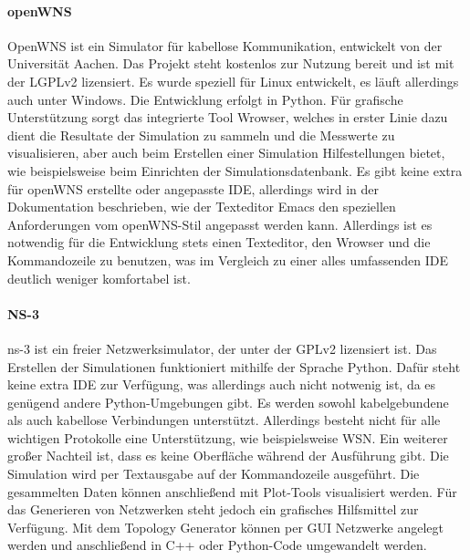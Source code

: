 \paragraph{openWNS\cite{openwns}}

OpenWNS ist ein Simulator für kabellose Kommunikation, entwickelt von der Universität Aachen. Das Projekt steht kostenlos zur Nutzung bereit und ist mit der LGPLv2 lizensiert. \newline
Es wurde speziell für Linux entwickelt, es läuft allerdings auch unter Windows. Die Entwicklung erfolgt in Python. Für grafische Unterstützung sorgt das integrierte Tool Wrowser\cite{wrowser}, welches in erster Linie dazu dient die Resultate der Simulation zu sammeln und die Messwerte zu visualisieren, aber auch beim Erstellen einer Simulation Hilfestellungen bietet, wie beispielsweise beim Einrichten der Simulationsdatenbank.\newline
Es gibt keine extra für openWNS erstellte oder angepasste IDE, allerdings wird in der Dokumentation beschrieben, wie der Texteditor Emacs\cite{emacs} den speziellen Anforderungen vom openWNS-Stil angepasst werden kann. Allerdings ist es notwendig für die Entwicklung stets einen Texteditor, den Wrowser und die Kommandozeile zu benutzen, was im Vergleich zu einer alles umfassenden IDE deutlich weniger komfortabel ist.

\paragraph{NS-3\cite{ns3}}

ns-3 ist ein freier Netzwerksimulator, der unter der GPLv2 lizensiert ist. Das Erstellen der Simulationen funktioniert mithilfe der Sprache Python. Dafür steht keine extra IDE zur Verfügung, was allerdings auch nicht notwenig ist, da es genügend andere Python-Umgebungen gibt.\newline
Es werden sowohl kabelgebundene als auch kabellose Verbindungen unterstützt. Allerdings besteht nicht für alle wichtigen Protokolle eine Unterstützung, wie beispielsweise WSN.\newline
Ein weiterer großer Nachteil ist, dass es keine Oberfläche während der Ausführung gibt. Die Simulation wird per Textausgabe auf der Kommandozeile ausgeführt. Die gesammelten Daten können anschließend mit Plot-Tools visualisiert werden. Für das Generieren von Netzwerken steht jedoch ein grafisches Hilfsmittel zur Verfügung. Mit dem Topology Generator\cite{TopGen} können per GUI Netzwerke angelegt werden und anschließend in C++ oder Python-Code umgewandelt werden. 

